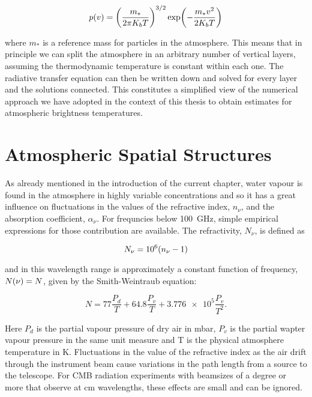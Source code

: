 \begin{equation}
        p\qty(v) = \qty(\frac{m_*}{2\pi K_b T})^{3/2}
        \exp(-\frac{m_* v^2}{2 K_b T})
\end{equation}

where $m_*$ is a reference mass for particles in the atmosphere.
This means that in principle we can split the atmosphere in an arbitrary
number of vertical layers, assuming the thermodynamic temperature is
constant within each one.  The radiative transfer equation can then be
written down and solved for every layer and the solutions connected. This
constitutes a simplified view of the numerical approach we have adopted in
the context of this thesis to obtain estimates for atmospheric brightness
temperatures.

\section{Atmospheric Spatial Structures}

As already mentioned in the introduction of the current chapter, water
vapour is found in the atmosphere in highly variable concentrations and so
it has a great influence on fluctuations in the values of the refractive
index, $n_\nu$, and the absorption coefficient, $\alpha_\nu$. For frequncies
below \SI{100}{\giga\hertz}, simple empirical expressions for those
contribution are available. The refractivity, $N_\nu$, is defined as

\begin{equation}
        N_\nu = \num{e6}\qty(n_\nu - 1)
\end{equation}

and in this wavelength range is approximately a constant function of
frequency, $N\qty(\nu) = N$, given by the Smith-Weintraub equation:

\begin{equation}
        N = 77\frac{P_d}{T} + 64.8\frac{P_v}{T} +
        \num{3.776e5}\frac{P_v}{T^2}.
\end{equation}

Here $P_d$ is the partial vapour pressure of dry air in
\si{\milli\bar}, $P_v$ is the partial wapter vapour pressure in the same
unit measure and T is the physical atmosphere temperature in \si{\kelvin}.
Fluctuations in the value of the refractive index as the air drift through
the instrument beam cause variations in the path length from a source to
the telescope. For CMB radiation experiments with beamsizes of a degree or
more that observe at \si{\centi\meter} wavelengths, these effects are small
and can be ignored.


